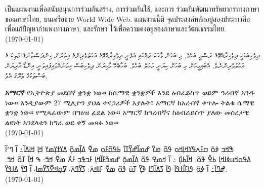 \documentclass[a4paper]{article}
\begin{document}
\begin{thai}
เป็น\wbr แผนงานเพื่อ\wbr สนับสนุน\wbr การ\wbr ร่วมกัน\wbr สร้าง, การ\wbr ร่วมกันใช้, และ\wbr การ%
ร่วมกัน\wbr พัฒนา\wbr ทรัพยากร\wbr ทาง\wbr ภาษา\wbr ของ\wbr ภาษา\wbr ไทย, บน\wbr เครือข่าย World Wide Web. แผนงานนี้\wbr มี%
จุด\wbr ประสงค์หลั\wbr กอยู่\wbr สอง\wbr ประการคือ เพื่อแก้ปัญหา\wbr กำ\wbr แพง\wbr ทาง\wbr ภาษา, และรักษา%
ไว้เพื่อ\wbr ความค\wbr งอยู่\wbr ของ\wbr ภาษา\wbr และ\wbr วัฒนธรรม\wbr ไทย. \\
(\today)
\end{thai}

\begin{divehi}\small\sloppy
ދިވެހިބަހަކީ ދިވެހިރާއްޖޭގެ ރަސްމީ ބަހެވެ. މި ބަހުން ވާހަކަ ދައްކައި އުޅެނީ ދިވެހިރާއްޖޭގެ އަހުލުވެރިންގެ އިތުރުން ހިންދުސްތާނުގެ މަލިކު ގެ
އަހުލުވެރިންނެވެ. އެބައިމީހުން މި ބަހަށް ކިޔަނީ މަހަލް ބަހެވެ. ބަހާބެހޭ މާހިރުން ދިވެހިބަސް ހިމަނުއްވައިފައިވަނީ އިންޑޯ އާރިޔަން ބަސްތަކުގެ
ތެރޭގަ އެވެ. 
\end{divehi}

%

\begin{amharic}
\textbf{አማርኛ} የኢትዮጵያ መደበኛ ቋንቋ ነው። ከሴማዊ ቋንቋዎች እንደ ዕብራይስጥ ወይም ዓረብኛ አንዱ ነው። እንዲያውም 27 ሚሊዮን ያህል ተናጋሪዎች እያሉት፣ አማርኛ ከአረብኛ ቀጥሎ ትልቁ ሴማዊ ቋንቋ ነው። የሚጻፈውም በግዕዝ ፊደል ነው። አማርኛ ክዓረብኛና ከዕብራይስጥ ያለው መሰረታዊ ልዩነት አንደላቲን ከግራ ወደ ቀኝ መጻፉ ነው። \\
(\today)
\end{amharic}

\begin{nko}
ߒߞߏ ߦߋ߫ ߛߓߍߟߌߞߊ߲ߞߋ ߟߋ߬ ߘߌ߫ ߝߘߊ߬ߝߌ߲߬ߠߊ߫ ߕߟߋ߬ߓߋ ߘߐ߫ ߡߊ߲߬ߘߋ߲߬ ߡߌߙߌ߲ߘߌ ߞߊ߲ ߞߊߡߊ߬߸ ߊ߬ ߣߴߊ߬ ߡߟߋߞߎߦߊߞߊ߲ ߕߐ߮ ߟߋ߬. ߞߊ߬ߕߎ߲߯ ߸ ߊ߬ ߞߘߐ ߟߋ߬ ߡߊ߲߬ߘߋ߲߫ ߝߘߏ߬ߓߊ߬ߞߊ߲ ߓߏߟߏ߲ ߓߍ߯ ߘߐ߫ ߞߏ߫: ߒ ߞߊ߲߫ ߠߋ߬ ߞߏ߫. ߝߣߊ߫߸ ߊ߬ ߦߋ߫ ߟߊߓߊ߯ߙߟߊ߫ ߟߊ߫ ߖߡߊ߬ߣߊ ߢߌ߲߬ ߠߎ߫ ߟߋ߬ ߘߐ߫ ߓߊߞߍ߭: ߖߌ߬ߣߍ߫، ߜߋ߲ߞߐ߰ߖߌ߬ߘߊ، ߊ߬ ߣߌ߫ ߡߊߟߌ߫.
\\
(\today)
\end{nko}
\end{document}
